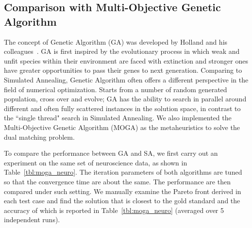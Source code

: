\subsection{Comparison with Multi-Objective Genetic Algorithm}
The concept of Genetic Algorithm (GA) was developed by Holland and his colleagues~\cite{Holland1992}. GA is first inspired by the evolutionary process in which weak and unfit species within their environment are faced with extinction and stronger ones have greater opportunities to pass their genes to next generation. Comparing to Simulated Annealing, Genetic Algorithm often offers a different perspective in the field of numerical optimization. Starts from a number of random generated population, cross over and evolve; GA has the ability to search in parallel around different and often fully scattered instances in the solution space, in contrast to the ``single thread" search in Simulated Annealing. We also implemented the Multi-Objective Genetic Algorithm (MOGA) as the metaheuristics to solve the dual matching problem.


To compare the performance between GA and SA, we first carry out an experiment on the same set of neuroscience data, as shown in Table~\ref{tbl:moga_neuro}. The iteration parameters of both algorithms are tuned so that the convergence time are about the same. The performance are then compared under such setting. We manually examine the Pareto front derived in each test case and find the solution that is closest to the gold standard and the accuracy of which is reported in Table~\ref{tbl:moga_neuro} (averaged over 5 independent runs).


